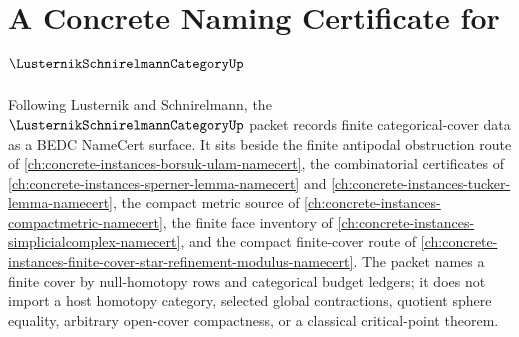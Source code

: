 \chapter{A Concrete Naming Certificate for $\LusternikSchnirelmannCategoryUp$}
\label{ch:concrete-instances-lusternik-schnirelmann-category-namecert}

Following Lusternik and Schnirelmann, the $\LusternikSchnirelmannCategoryUp$ packet records finite categorical-cover data as a BEDC NameCert surface. It sits beside the finite antipodal obstruction route of \autoref{ch:concrete-instances-borsuk-ulam-namecert}, the combinatorial certificates of \autoref{ch:concrete-instances-sperner-lemma-namecert} and \autoref{ch:concrete-instances-tucker-lemma-namecert}, the compact metric source of \autoref{ch:concrete-instances-compactmetric-namecert}, the finite face inventory of \autoref{ch:concrete-instances-simplicialcomplex-namecert}, and the compact finite-cover route of \autoref{ch:concrete-instances-finite-cover-star-refinement-modulus-namecert}. The packet names a finite cover by null-homotopy rows and categorical budget ledgers; it does not import a host homotopy category, selected global contractions, quotient sphere equality, arbitrary open-cover compactness, or a classical critical-point theorem.

